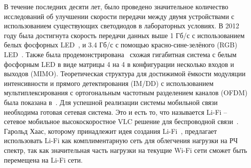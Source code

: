 В течение последних десяти лет, было проведено значительное количество исследований об улучшении скорости передачи между двумя устройствами с использованием существующих светодиодов в лабораторных условиях. В 2012 году была достигнута скорость передачи данных выше 1 Гб/с с использованием белых фосфорных LED~\cite{Khalid2012}, и 3.4 Гб/с с помощью красно-сине-зелёного (RGB) LED~\cite{Cossu2012}. Также была продемонстрирована~\cite{Azhar2013} схожая гигабитная система с белым фосфорным LED в виде матрицы 4 на 4 в конфигурации несколько входов и выходов (MIMO). Теоретическая структура для достижимой ёмкости модуляции интенсивности и прямого детектирования (IM/DD) с использованием мультиплексирования с ортогональным частотным разделением каналов (OFDM) была показана в~\cite{Dimitrov2013}. Для успешной реализации системы мобильной связи необходима готовая сетевая система. Это и есть то, что называется Li-Fi \--- сетевое мобильное высокоскоростное VLC решение для беспроводной связи~\cite{Harald2014}. Гарольд Хаас, которому принадлежит идея создания Li-Fi~\cite{Haas16}, предлагает использовать Li-Fi как комплиментарную сеть для облегчения нагрузки на РЧ спектр, так как значительная часть нагрузки на текущие Wi-Fi сети сможет быть перемещена на Li-Fi сети. 

